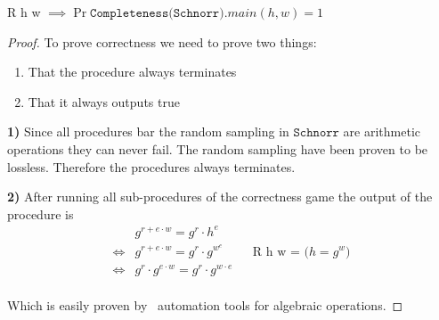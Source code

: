 \begin{lemma}
  R h w $\implies \Pr{\texttt{Completeness(Schnorr)}.main(h,w)} = 1$
\end{lemma}
\begin{proof}
  To prove correctness we need to prove two things:
  \begin{enumerate}
    \item That the procedure always terminates
    \item That it always outputs true
  \end{enumerate}
  \textbf{1)} Since all procedures bar the random sampling in $\texttt{Schnorr}$ are arithmetic
  operations they can never fail. The random sampling have been proven to be
  lossless. Therefore the procedures always terminates.

  \noindent\textbf{2)} After running all sub-procedures of the correctness game
  the output of the procedure is
  \begin{align*}
         &g^{r + e \cdot w} = g^{r} \cdot h^{e} \\
    \iff &g^{r + e \cdot w} = g^{r} \cdot g^{w^{e}} && \text{R h w = ($h = g^{w}$)} \\
    \iff &g^{r} \cdot g^{e \cdot w} = g^{r} \cdot g^{w \cdot {e}} \\
  \end{align*}

  Which is easily proven by \easycrypt\ automation tools for algebraic operations.
\end{proof}

